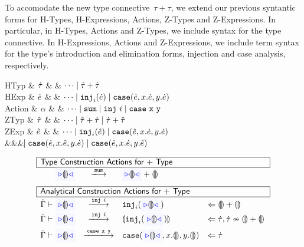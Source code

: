 
\newcommand{\TABperformAna}[5]{#1 \vdash & #2                & \xlongrightarrow{#4} & #5 & \Leftarrow #3}
\newcommand{\TABperformSyn}[6]{#1 \vdash & #2 \Rightarrow #3 & \xlongrightarrow{#4} & #5 \Rightarrow #6}
\newcommand{\TABperformTyp}[3]{& #1 & \xlongrightarrow{#2} & #3}

\newcommand{\TABperformMove}[3]{#1 \xlongrightarrow{#2} #3}
\newcommand{\TABperformDel}[2]{#1 \xlongrightarrow{\aDel} #2}

To accomodate the new type connective~$\tau + \tau$, we extend our
previous syntantic forms for H-Types, H-Expressions, Actions, Z-Types and Z-Expressions.  
%
In particular,
in H-Types, Actions and Z-Types, we include syntax for the type connective.
%
In H-Expressions, Actions and Z-Expressions, we include term syntax
for the type's introduction and elimination forms, injection and case
analysis, respectively.

\begin{grammar}
\textsf{HTyp} & $\dot{\tau}$ & \bnfas & $\cdots \mathrel{\mid} {\dot{\tau}} + {\dot{\tau}}$
\\
\textsf{HExp} & $\dot{e}$ & \bnfas & $\cdots 
\mathrel{\mid} \texttt{inj}_{i}({\dot{e}})
\mathrel{\mid} \texttt{case}({\dot{e}},{x}.{\dot{e}},{y}.{\dot{e}})$
\\
\textsf{Action} & $\alpha$ & \bnfas & $\cdots \mathrel{\mid} \mathtt{sum} \mathrel{\mid} \mathtt{inj}~i \mathrel{\mid} \mathtt{case~x~y}$
\\[3mm]
\textsf{ZTyp} & $\hat{\tau}$ & \bnfas & $\cdots \mathrel{\mid} {\hat{\tau}} + {\dot{\tau}} \mathrel{\mid} {\dot{\tau}} + {\hat{\tau}}$
\\
\textsf{ZExp} & $\hat{e}$ & \bnfas & $\cdots
\mathrel{\mid} \texttt{inj}_{i}({\hat{e}})
\mathrel{\mid} \texttt{case}({\hat{e}},{x}.{\dot{e}},{y}.{\dot{e}})
$
\\
&&& $
\hspace{-1.02ex}\mathrel{\mid} \texttt{case}({\dot{e}},{x}.{\hat{e}},{y}.{\dot{e}})
\mathrel{\mid}    \texttt{case}({\dot{e}},{x}.{\dot{e}},{y}.{\hat{e}})$
\end{grammar}

\[
\begin{array}{r@{~}l@{~~~}c@{~~~}ll@{~~}}
  \hline
  \multicolumn{5}{|l|}{\textsf{Type Construction Actions for $+$ Type}}
  \\
  \hline
  \TABperformTyp{\zwsel{\hehole}}{\aConstructx{\fsum}}
  {\tsum{\zwsel{\hehole}}{\hehole}}
  \\[3mm]
  \hline
  \multicolumn{5}{|l|}{\textsf{Analytical Construction Actions for $+$ Type}}
  \\
  \hline
  \TABperformAna{\hGamma}{\zwsel{\hehole}}
              {\tsum{\hehole}{\hehole}}
              {\aConstructx{\finj{i}}}
              {\hinj{i}{\zwsel{\hehole}}}
  \\
  \TABperformAna{\hGamma}{\zwsel{\hehole}}
              {\htau, \tincompat{\htau}{ \tsum{\hehole}{\hehole} }}
              {\aConstructx{\finj{i}}}
              {\hhole{\hinj{i}{\zwsel{\hehole}}}}
  \\[2mm]
  \TABperformAna{\hGamma}{\zwsel{\hehole}}
              {\htau}
              {\aConstructx{\fcase{x}{y}}}
              {\hcase{\zwsel{\hehole}}{x}{\hehole}{y}{\hehole}}

\end{array}
\]
